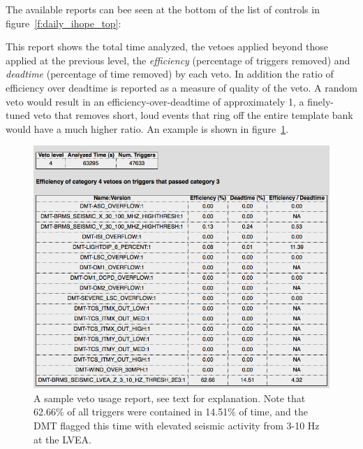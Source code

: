The available reports can bee seen at the bottom of the list of
controls in figure~\ref{f:daily_ihope_top}:


This report shows the total time analyzed, the vetoes applied beyond
those applied at the previous level, the \emph{efficiency} (percentage
of triggers removed) and \emph{deadtime} (percentage of time removed)
by each veto.  In addition the ratio of efficiency over deadtime is
reported as a measure of quality of the veto.  A random veto would
result in an efficiency-over-deadtime of approximately 1, a
finely-tuned veto that removes short, loud events that ring off the
entire template bank would have a much higher ratio.   An example is
shown in figure~\ref{f:daily_ihope_vetousage}.


\begin{figure}
  \includegraphics[width=\linewidth]{figures/detchar/vetousage.png}
  \caption[Sample veto usage report from Aug 19, 2010]{
  \label{f:daily_ihope_vetousage}
A sample veto usage report, see text for explanation.  Note that 62.66\% of
all triggers were contained in 14.51\% of time, and the DMT flagged this time
with elevated seismic activity from 3-10 Hz at the LVEA.}
\end{figure}%


